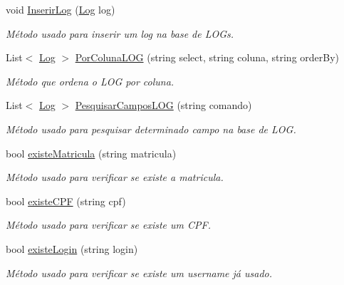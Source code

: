 \begin{DoxyCompactItemize}
void \hyperlink{class_sistema_r_h_1_1_adaptador_aeb5690fbd57be126b109ef98ca6e199b}{InserirLog} (\hyperlink{class_sistema_r_h_1_1_log}{Log} log)
\begin{DoxyCompactList}\small\item\em Método usado para inserir um log na base de LOGs. \item\end{DoxyCompactList}\item 
List$<$ \hyperlink{class_sistema_r_h_1_1_log}{Log} $>$ \hyperlink{class_sistema_r_h_1_1_adaptador_a0fad872479f1b548be84b87aba8421aa}{PorColunaLOG} (string select, string coluna, string orderBy)
\begin{DoxyCompactList}\small\item\em Método que ordena o LOG por coluna. \item\end{DoxyCompactList}\item 
List$<$ \hyperlink{class_sistema_r_h_1_1_log}{Log} $>$ \hyperlink{class_sistema_r_h_1_1_adaptador_a098e5c1db1115eb9fd04013eff7001b8}{PesquisarCamposLOG} (string comando)
\begin{DoxyCompactList}\small\item\em Método usado para pesquisar determinado campo na base de LOG. \item\end{DoxyCompactList}\item 
bool \hyperlink{class_sistema_r_h_1_1_adaptador_a412794e35c3ec8f20de141e80e3a089a}{existeMatricula} (string matricula)
\begin{DoxyCompactList}\small\item\em Método usado para verificar se existe a matricula. \item\end{DoxyCompactList}\item 
bool \hyperlink{class_sistema_r_h_1_1_adaptador_a09d2efcbfd034dcc2d52f6174d35c9b6}{existeCPF} (string cpf)
\begin{DoxyCompactList}\small\item\em Método usado para verificar se existe um CPF. \item\end{DoxyCompactList}\item 
bool \hyperlink{class_sistema_r_h_1_1_adaptador_aa432bf5f72ad8945fa623b7d6b63cbc4}{existeLogin} (string login)
\begin{DoxyCompactList}\small\item\em Método usado para verificar se existe um username já usado. \item\end{DoxyCompactList}\item 

\end{DoxyCompactItemize}
